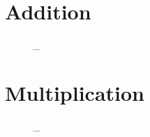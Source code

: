\documentclass{article}
\makeatletter
\newcommand{\escapeus}{\begingroup\@makeother\_\@escapeus}
\newcommand*{\@escapeus}[1]{#1\endgroup}
\makeatother
\begin{document}
\newpage

\section{Addition}
\begin{figure}[H]
    \centering
    \escapeus{}
\end{figure} 
\newpage

\section{Multiplication}
\begin{figure}[H]
    \centering
    \escapeus{}
\end{figure}
\newpage
\end{document}
